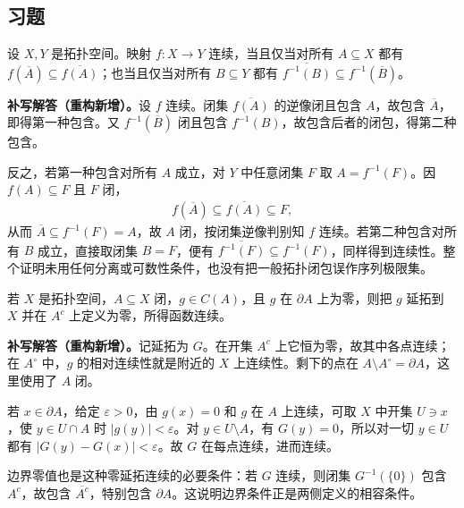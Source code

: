 \documentclass[../../main.tex]{subfiles}%
\begin{document}
\subsection*{习题}
\begin{exercise}\label{exercise:ch04-continuity-closure}
设 $X,Y$ 是拓扑空间。映射 $f:X\to Y$ 连续，当且仅当对所有 $A\subseteq X$ 都有 $f(\overline A)\subseteq\overline{f(A)}$；也当且仅当对所有 $B\subseteq Y$ 都有 $\overline{f^{-1}(B)}\subseteq f^{-1}(\overline B)$。
\end{exercise}
\begin{solution}
\textbf{补写解答（重构新增）。}设 $f$ 连续。闭集 $\overline{f(A)}$ 的逆像闭且包含 $A$，故包含 $\overline A$，即得第一种包含。又 $f^{-1}(\overline B)$ 闭且包含 $f^{-1}(B)$，故包含后者的闭包，得第二种包含。

反之，若第一种包含对所有 $A$ 成立，对 $Y$ 中任意闭集 $F$ 取 $A=f^{-1}(F)$。因 $f(A)\subseteq F$ 且 $F$ 闭，
\begin{align*}
f(\overline A)\subseteq\overline{f(A)}\subseteq F,
\end{align*}
从而 $\overline A\subseteq f^{-1}(F)=A$，故 $A$ 闭，按闭集逆像判别知 $f$ 连续。若第二种包含对所有 $B$ 成立，直接取闭集 $B=F$，便有 $\overline{f^{-1}(F)}\subseteq f^{-1}(F)$，同样得到连续性。整个证明未用任何分离或可数性条件，也没有把一般拓扑闭包误作序列极限集。
\end{solution}
\begin{exercise}\label{exercise:ch04-zero-extension}
若 $X$ 是拓扑空间，$A\subseteq X$ 闭，$g\in C(A)$，且 $g$ 在 $\partial A$ 上为零，则把 $g$ 延拓到 $X$ 并在 $A^c$ 上定义为零，所得函数连续。
\end{exercise}
\begin{solution}
\textbf{补写解答（重构新增）。}记延拓为 $G$。在开集 $A^c$ 上它恒为零，故其中各点连续；在 $A^\circ$ 中，$g$ 的相对连续性就是附近的 $X$ 上连续性。剩下的点在 $A\setminus A^\circ=\partial A$，这里使用了 $A$ 闭。

若 $x\in\partial A$，给定 $\varepsilon>0$，由 $g(x)=0$ 和 $g$ 在 $A$ 上连续，可取 $X$ 中开集 $U\ni x$，使 $y\in U\cap A$ 时 $|g(y)|<\varepsilon$。对 $y\in U\setminus A$，有 $G(y)=0$，所以对一切 $y\in U$ 都有 $|G(y)-G(x)|<\varepsilon$。故 $G$ 在每点连续，进而连续。

边界零值也是这种零延拓连续的必要条件：若 $G$ 连续，则闭集 $G^{-1}(\{0\})$ 包含 $A^c$，故包含 $\overline{A^c}$，特别包含 $\partial A$。这说明边界条件正是两侧定义的相容条件。
\end{solution}
\end{document}
